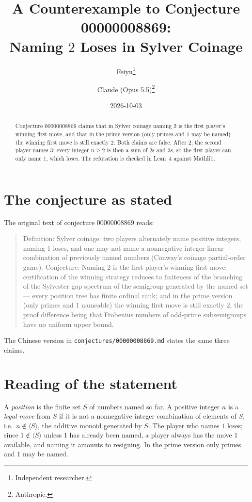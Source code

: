\documentclass[11pt]{article}
\title{A Counterexample to Conjecture 00000008869:\\
Naming $2$ Loses in Sylver Coinage}
\author{%
  Feiyu\thanks{Independent researcher.}
  \and
  Claude (Opus 5.5)\thanks{Anthropic.}%
}
\date{2026-10-03}
\theoremstyle{plain}
\theoremstyle{definition}
\theoremstyle{remark}
\begin{document}
\maketitle

\begin{abstract}
Conjecture 00000008869 claims that in Sylver coinage naming $2$ is the first player's
winning first move, and that in the prime version (only primes and $1$ may be named)
the winning first move is still exactly $2$. Both claims are false. After $2$, the
second player names $3$; every integer $n\ge2$ is then a sum of $2$s and $3$s, so the
first player can only name $1$, which loses. The refutation is checked in Lean~4
against Mathlib.
\end{abstract}

\section{The conjecture as stated}

The original text of conjecture 00000008869 reads:

\begin{quote}
Definition: Sylver coinage: two players alternately name positive integers, naming
$1$ loses, and one may not name a nonnegative integer linear combination of
previously named numbers (Conway's coinage partial-order game). Conjecture: Naming
$2$ is the first player's winning first move; certification of the winning strategy
reduces to finiteness of the branching of the Sylvester gap spectrum of the semigroup
generated by the named set --- every position tree has finite ordinal rank; and in
the prime version (only primes and $1$ nameable) the winning first move is still
exactly $2$, the proof difference being that Frobenius numbers of odd-prime
subsemigroups have no uniform upper bound.
\end{quote}

The Chinese version in \texttt{conjectures/00000008869.md} states the same three
claims.

\section{Reading of the statement}

A \emph{position} is the finite set $S$ of numbers named so far. A positive integer
$n$ is a \emph{legal move} from $S$ if it is not a nonnegative integer combination of
elements of $S$, i.e.\ $n\notin\langle S\rangle$, the additive monoid generated by
$S$. The player who names $1$ loses; since $1\notin\langle S\rangle$ unless $1$ has
already been named, a player always has the move $1$ available, and naming it amounts
to resigning. In the prime version only primes and $1$ may be named.
\end{document}
